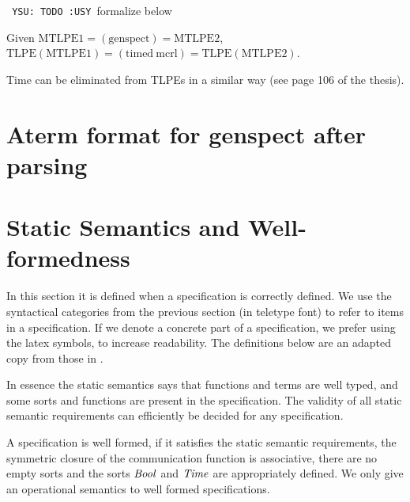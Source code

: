 \documentclass[twoside,fleqn,a4paper,dvips]{article}
\def\YSU{\texttt{ YSU: TODO :USY\marginpar{!!!} }}
\begin{document}
\YSU formalize below

\begin{thm}
  Given 
  $\mathrm{MTLPE1}=(\mathrm{genspect})=\mathrm{MTLPE2}$,\\
  $\mathrm{TLPE(MTLPE1)}=(\mathrm{timed\ mcrl})=\mathrm{TLPE(MTLPE2)}$.
\end{thm}

Time can be eliminated from TLPEs in a similar way (see page 106 of
the thesis).

\appendix
\newpage
\section{Aterm format for genspect after parsing}

\section{Static Semantics and Well-formedness}
\label{section:SSC} 
In this section it is defined when a specification is correctly defined.
We use the syntactical categories from the previous section (in teletype
font) to refer to items in a specification. If we denote a
concrete part of a specification, we prefer using the latex symbols, to
increase readability. The definitions below are an adapted copy from those in
\cite{GroPo94a}.

In
essence the static semantics says that functions and terms are well
typed, and some sorts and functions are present in the specification. The
validity of all static semantic requirements can efficiently be decided for any
specification.

A specification is well formed, if it satisfies the static semantic requirements,
the symmetric closure of the communication function is associative, there are no
empty sorts and the sorts $\mathit{Bool}$ and $\mathit{Time}$ are appropriately defined. We
only give an operational semantics to well formed specifications.
\end{document}

